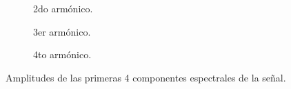 \begin{figure}[H]
\begin{subfigure}[H]{0.40\textwidth}
          \caption{2do armónico.}
        \end{subfigure}
        \hfill 
        \begin{subfigure}[H]{0.40\textwidth}
          \caption{3er armónico.}
        \end{subfigure}
        \hfill 
        \begin{subfigure}[H]{0.40\textwidth}
          \caption{4to armónico.}
        \end{subfigure}

        \caption{Amplitudes de las primeras 4 componentes espectrales de la señal.}
        \label{fig:SeñalCuad_MedicAmplOscilo}
      \end{figure}

